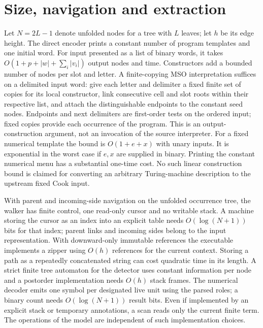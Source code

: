 \section{Size, navigation and extraction}
Let \(N=2L-1\) denote unfolded nodes for a tree with \(L\) leaves; let \(h\) be its edge height. The direct encoder prints a constant number of program templates and one initial word. For input presented as a list of binary words, it takes \(O(1+p+|w|+\sum_i |v_i|)\) output nodes and time. Constructors add a bounded number of nodes per slot and letter. A finite-copying MSO interpretation suffices on a delimited input word: give each letter and delimiter a fixed finite set of copies for its local constructor, link consecutive cell and slot roots within their respective list, and attach the distinguishable endpoints to the constant seed nodes. Endpoints and next delimiters are first-order tests on the ordered input; fixed copies provide each occurrence of the program. This is an output-construction argument, not an invocation of the source interpreter. For a fixed numerical template the bound is \(O(1+e+x)\) with unary inputs. It is exponential in the worst case if \(e,x\) are supplied in binary. Printing the constant numerical menu has a substantial one-time cost. No such linear construction bound is claimed for converting an arbitrary Turing-machine description to the upstream fixed Cook input.

With parent and incoming-side navigation on the unfolded occurrence tree, the walker has finite control, one read-only cursor and no writable stack. A machine storing the cursor as an index into an explicit table needs \(O(\log(N+1))\) bits for that index; parent links and incoming sides belong to the input representation. With downward-only immutable references the executable implements a zipper using \(O(h)\) references for the current context. Storing a path as a repeatedly concatenated string can cost quadratic time in its length. A strict finite tree automaton for the detector uses constant information per node and a postorder implementation needs \(O(h)\) stack frames. The numerical decoder emits one symbol per designated live unit using the parsed roles; a binary count needs \(O(\log(N+1))\) result bits. Even if implemented by an explicit stack or temporary annotations, a scan reads only the current finite term. The operations of the model are independent of such implementation choices.

